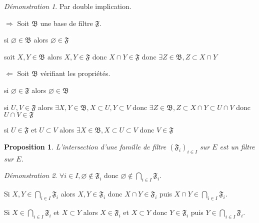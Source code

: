 \documentclass[a4paper, 11pt, french]{book}
\newenvironment{itemise}{\itemize}{\enditemize}
\theoremstyle{plain} %
\newtheorem{proposition}{Proposition}
\theoremstyle{definition} %
\theoremstyle{remark} %
\newtheorem*{demonstration}{Démonstration}
\newcommand{\1}{\mathds{1}}
\newcommand\vide{\varnothing}
\begin{document}
\begin{demonstration}
	Par double implication.
	\begin{itemise}
		\item[$\Rightarrow$] Soit $\mathfrak{B}$ une base de filtre $\mathfrak{F}$.
		\begin{itemise}
			\item si $\vide\in\mathfrak{B}$ alors $\vide\in\mathfrak{F}$
			\item soit $X, Y\in\mathfrak{B}$ alors $X, Y\in\mathfrak{F}$ donc $X\cap Y\in\mathfrak{F}$ donc $\exists Z\in\mathfrak{B}, Z\subset X\cap Y$
		\end{itemise}
		\item[$\Leftarrow$] Soit $\mathfrak{B}$ vérifiant les propriétés.
		\begin{itemise}
			\item si $\vide\in\mathfrak{F}$ alors $\vide\in\mathfrak{B}$
			\item si $U, V\in\mathfrak{F}$ alors $\exists X, Y\in\mathfrak{B}, X\subset U, Y\subset V$ donc $\exists Z\in\mathfrak{B}, Z\subset X\cap Y\subset U\cap V$ donc $U\cap V\in\mathfrak{F}$
			\item si $U\in\mathfrak{F}$ et $U\subset V$ alors $\exists X\in\mathfrak{B}, X\subset U\subset V$ donc $V\in\mathfrak{F}$
		\end{itemise}
	\end{itemise}
\end{demonstration}

\begin{proposition}
	L'intersection d'une famille de filtre $(\mathfrak{F}_i)_{i\in I}$ sur $E$ est un filtre sur $E$.
\end{proposition}

\begin{demonstration}
	\begin{itemise}
		\item $\forall i\in I, \vide\notin\mathfrak{F}_i$ donc $\vide\notin\bigcap_{i\in I}\mathfrak{F}_i$.
		\item Si $X, Y\in\bigcap_{i\in I}\mathfrak{F}_i$ alors $X, Y\in\mathfrak{F}_i$ donc $X\cap Y\in\mathfrak{F}_i$ puis $X\cap Y\in\bigcap_{i\in I}\mathfrak{F}_i$.
		\item Si $X\in\bigcap_{i\in I}\mathfrak{F}_i$ et $X\subset Y$ alors $X\in\mathfrak{F}_i$ et $X\subset Y$ donc $Y\in\mathfrak{F}_i$ puis $Y\in\bigcap_{i\in I}\mathfrak{F}_i$.
	\end{itemise}
\end{demonstration}
\end{document}
